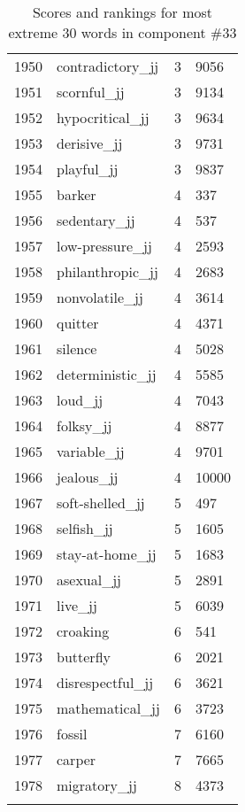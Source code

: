 \begin{longtable}[!htbp]{| rlr@{.}l |}
    1950 & contradictory\_jj & 3 & 9056 \\
    1951 & scornful\_jj & 3 & 9134 \\
    1952 & hypocritical\_jj & 3 & 9634 \\
    1953 & derisive\_jj & 3 & 9731 \\
    1954 & playful\_jj & 3 & 9837 \\
    1955 & barker & 4 & 337 \\
    1956 & sedentary\_jj & 4 & 537 \\
    1957 & low-pressure\_jj & 4 & 2593 \\
    1958 & philanthropic\_jj & 4 & 2683 \\
    1959 & nonvolatile\_jj & 4 & 3614 \\
    1960 & quitter & 4 & 4371 \\
    1961 & silence & 4 & 5028 \\
    1962 & deterministic\_jj & 4 & 5585 \\
    1963 & loud\_jj & 4 & 7043 \\
    1964 & folksy\_jj & 4 & 8877 \\
    1965 & variable\_jj & 4 & 9701 \\
    1966 & jealous\_jj & 4 & 10000 \\
    1967 & soft-shelled\_jj & 5 & 497 \\
    1968 & selfish\_jj & 5 & 1605 \\
    1969 & stay-at-home\_jj & 5 & 1683 \\
    1970 & asexual\_jj & 5 & 2891 \\
    1971 & live\_jj & 5 & 6039 \\
    1972 & croaking & 6 & 541 \\
    1973 & butterfly & 6 & 2021 \\
    1974 & disrespectful\_jj & 6 & 3621 \\
    1975 & mathematical\_jj & 6 & 3723 \\
    1976 & fossil & 7 & 6160 \\
    1977 & carper & 7 & 7665 \\
    1978 & migratory\_jj & 8 & 4373 \\
    \hline
    \caption{Scores and rankings for most extreme 30 words in component \#33} \\
\end{longtable}
